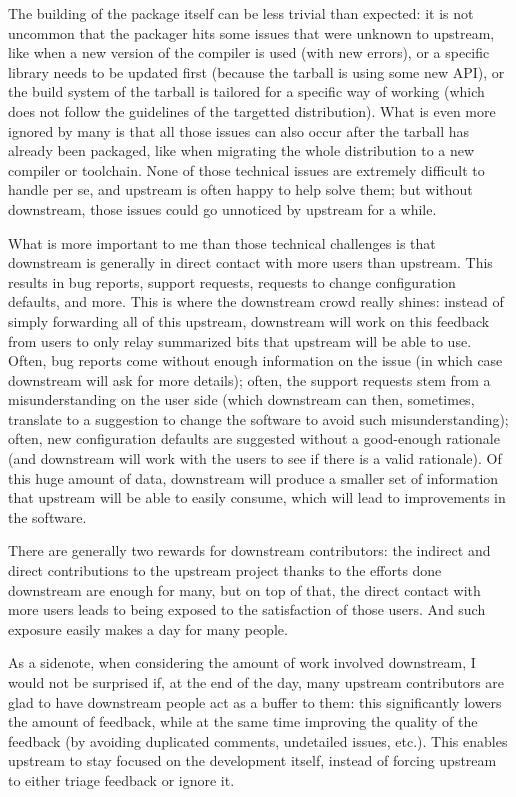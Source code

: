 The building of the package itself can be less trivial than expected: it is not
uncommon that the packager hits some issues that were unknown to upstream, like
when a new version of the compiler is used (with new errors), or a specific
library needs to be updated first (because the tarball is using some new API),
or the build system of the tarball is tailored for a specific way of working
(which does not follow the guidelines of the targetted distribution). What is
even more ignored by many is that all those issues can also occur after the
tarball has already been packaged, like when migrating the whole distribution
to a new compiler or toolchain. None of those technical issues are extremely
difficult to handle per se, and upstream is often happy to help solve them; but
without downstream, those issues could go unnoticed by upstream for a while.

What is more important to me than those technical challenges is that downstream
is generally in direct contact with more users than upstream. This results in
bug reports, support requests, requests to change configuration defaults, and
more. This is where the downstream crowd really shines: instead of simply
forwarding all of this upstream, downstream will work on this feedback from
users to only relay summarized bits that upstream will be able to use. Often,
bug reports come without enough information on the issue (in which case
downstream will ask for more details); often, the support requests stem from a
misunderstanding on the user side (which downstream can then, sometimes,
translate to a suggestion to change the software to avoid such
misunderstanding); often, new configuration defaults are suggested without a
good-enough rationale (and downstream will work with the users to see if there
is a valid rationale). Of this huge amount of data, downstream will produce a
smaller set of information that upstream will be able to easily consume, which
will lead to improvements in the software.

There are generally two rewards for downstream contributors: the indirect and
direct contributions to the upstream project thanks to the efforts done
downstream are enough for many, but on top of that, the direct contact with
more users leads to being exposed to the satisfaction of those users. And such
exposure easily makes a day for many people.

As a sidenote, when considering the amount of work involved downstream, I would
not be surprised if, at the end of the day, many upstream contributors are glad
to have downstream people act as a buffer to them: this significantly lowers
the amount of feedback, while at the same time improving the quality of the
feedback (by avoiding duplicated comments, undetailed issues, etc.). This
enables upstream to stay focused on the development itself, instead of forcing
upstream to either triage feedback or ignore it.

